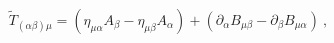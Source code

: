 \begin{equation}
\tilde{T}_{(\alpha \beta )\mu }=\left( \eta _{\mu \alpha }A_{\beta }-\eta
_{\mu \beta }A_{\alpha }\right) +\left( \partial _{\alpha }B_{\mu \beta
}-\partial _{\beta }B_{\mu \alpha }\right) \ ,  \label{exp}
\end{equation}%
